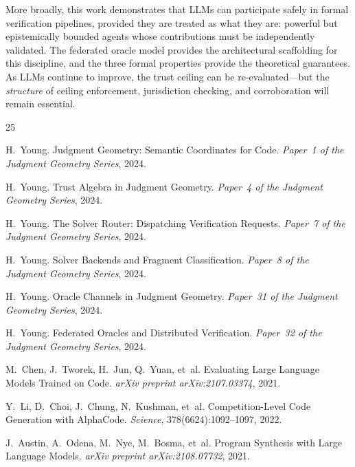 \documentclass[11pt]{article}
\begin{document}
More broadly, this work demonstrates that LLMs can participate
safely in formal verification pipelines, provided they are treated
as what they are: powerful but epistemically bounded agents whose
contributions must be independently validated.  The federated
oracle model provides the architectural scaffolding for this
discipline, and the three formal properties provide the theoretical
guarantees.  As LLMs continue to improve, the trust ceiling can be
re-evaluated---but the \emph{structure} of ceiling enforcement,
jurisdiction checking, and corroboration will remain essential.


\begin{thebibliography}{25}

H.~Young.
\newblock Judgment Geometry: Semantic Coordinates for Code.
\newblock \emph{Paper~1 of the Judgment Geometry Series}, 2024.

H.~Young.
\newblock Trust Algebra in Judgment Geometry.
\newblock \emph{Paper~4 of the Judgment Geometry Series}, 2024.

H.~Young.
\newblock The Solver Router: Dispatching Verification Requests.
\newblock \emph{Paper~7 of the Judgment Geometry Series}, 2024.

H.~Young.
\newblock Solver Backends and Fragment Classification.
\newblock \emph{Paper~8 of the Judgment Geometry Series}, 2024.

H.~Young.
\newblock Oracle Channels in Judgment Geometry.
\newblock \emph{Paper~31 of the Judgment Geometry Series}, 2024.

H.~Young.
\newblock Federated Oracles and Distributed Verification.
\newblock \emph{Paper~32 of the Judgment Geometry Series}, 2024.

M.~Chen, J.~Tworek, H.~Jun, Q.~Yuan, et~al.
\newblock Evaluating Large Language Models Trained on Code.
\newblock \emph{arXiv preprint arXiv:2107.03374}, 2021.

Y.~Li, D.~Choi, J.~Chung, N.~Kushman, et~al.
\newblock Competition-Level Code Generation with AlphaCode.
\newblock \emph{Science}, 378(6624):1092--1097, 2022.

J.~Austin, A.~Odena, M.~Nye, M.~Bosma, et~al.
\newblock Program Synthesis with Large Language Models.
\newblock \emph{arXiv preprint arXiv:2108.07732}, 2021.


\end{thebibliography}
\end{document}
